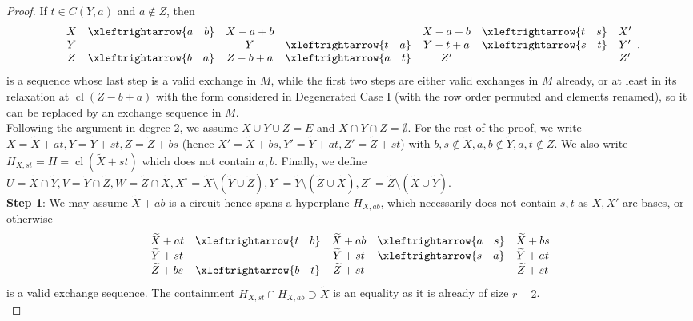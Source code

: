 \documentclass{amsart}
\newcommand{\swap}[2]{\xleftrightarrow{#1 \quad #2}}
\DeclareMathOperator{\cl}{cl}
\begin{document}
\begin{proof}
If $t\in C(Y,a)$ and $a\not\in Z$, then
$$
\begin{array}{c c c c c c c}
   X & \swap{a}{b} & X-a+b &          & X-a+b  & \swap{t}{s} & X' \\
   Y &            & Y &  \swap{t}{a}  & Y-t+a & \swap{s}{t}  & Y' \\
   Z & \swap{b}{a}  & Z-b+a & \swap{a}{t}  & Z'  &            & Z'
\end{array}.
$$
is a sequence whose last step is a valid exchange in $M$, while the first two steps are either valid exchanges in $M$ already, or at least in its relaxation at $\cl(Z-b+a)$ with the form considered in Degenerated Case I (with the row order permuted and elements renamed), so it can be replaced by an exchange sequence in $M$.\\

    Following the argument in degree 2, we assume $X\cup Y\cup Z=E$ and $X\cap Y\cap Z=\emptyset$.
    For the rest of the proof, we write $X=\widetilde{X}+at, Y=\widetilde{Y}+st, Z=\widetilde{Z}+bs$ (hence $X'=\widetilde{X}+bs, Y'=\widetilde{Y}+at, Z'=\widetilde{Z}+st$) with $b,s\not\in\widetilde{X}, a,b\not\in \widetilde{Y}, a,t\not\in \widetilde{Z}$. We also write $H_{X,st}=H=\cl(\widetilde{X}+st)$ which does not contain $a,b$. Finally, we define $U=\widetilde{X}\cap \widetilde{Y}, V=\widetilde{Y}\cap \widetilde{Z}, W=\widetilde{Z}\cap \widetilde{X}, X^\circ=\widetilde{X}\setminus (\widetilde{Y}\cup \widetilde{Z}), Y^\circ=\widetilde{Y}\setminus (\widetilde{Z}\cup \widetilde{X}), Z^\circ=\widetilde{Z}\setminus (\widetilde{X}\cup \widetilde{Y})$.\\

{\bf Step 1}: We may assume $\widetilde{X}+ab$ is a circuit hence spans a hyperplane $H_{X,ab}$, which necessarily does not contain $s,t$ as $X,X'$ are bases, or otherwise
$$
\begin{array}{c c c c c}
   \widetilde{X}+at & \swap{t}{b} & \widetilde{X}+ab  & \swap{a}{s} & \widetilde{X}+bs \\
   \widetilde{Y}+st &           & \widetilde{Y}+st & \swap{s}{a}  & \widetilde{Y}+at \\
   \widetilde{Z}+bs & \swap{b}{t}  & \widetilde{Z}+st  &            & \widetilde{Z}+st
\end{array}
$$
is a valid exchange sequence. The containment $H_{X,st}\cap H_{X,ab}\supset\widetilde{X}$ is an equality as it is already of size $r-2$.\\


\end{proof}
\end{document}
